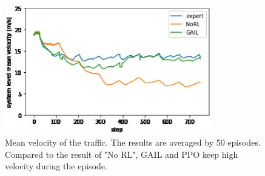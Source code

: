 \begin{figure}[]
    \begin{center}
    \includegraphics[width=9cm]{img/velocity.eps}
    \caption{Mean velocity of the traffic. The results are averaged by 50 episodes. Compared to the result of "No RL", GAIL and PPO keep high velocity during the episode.}
    \label{fig:velocity}
    \end{center}
\end{figure}
